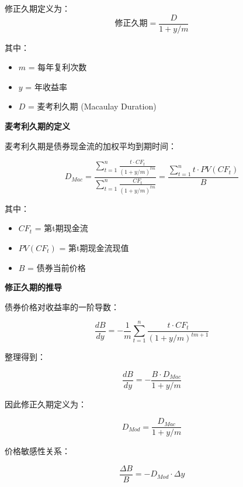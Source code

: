 修正久期定义为：
\begin{equation}
\text{修正久期} = \frac{D}{1 + y/m}
\end{equation}

\noindent 其中：
\begin{itemize}
    \item $m$ = 每年复利次数
    \item $y$ = 年收益率
    \item $D$ = 麦考利久期 (Macaulay Duration)
\end{itemize}




\textbf{麦考利久期的定义}

麦考利久期是债券现金流的加权平均到期时间：

\begin{equation}
D_{Mac} = \frac{\sum_{t=1}^{n} \frac{t \cdot CF_t}{(1+y/m)^{tm}}}{\sum_{t=1}^{n} \frac{CF_t}{(1+y/m)^{tm}}} = \frac{\sum_{t=1}^{n} t \cdot PV(CF_t)}{B}
\end{equation}

\noindent 其中：
\begin{itemize}
    \item $CF_t$ = 第t期现金流
    \item $PV(CF_t)$ = 第t期现金流现值
    \item $B$ = 债券当前价格
\end{itemize}

\textbf{修正久期的推导}

债券价格对收益率的一阶导数：

\begin{equation}
\frac{dB}{dy} = -\frac{1}{m} \sum_{t=1}^{n} \frac{t \cdot CF_t}{(1+y/m)^{tm+1}}
\end{equation}

整理得到：

\begin{equation}
\frac{dB}{dy} = -\frac{B \cdot D_{Mac}}{1 + y/m}
\end{equation}

因此修正久期定义为：

\begin{equation}
D_{Mod} = \frac{D_{Mac}}{1 + y/m}
\end{equation}

价格敏感性关系：

\begin{equation}
\frac{\Delta B}{B} = -D_{Mod} \cdot \Delta y
\end{equation}

